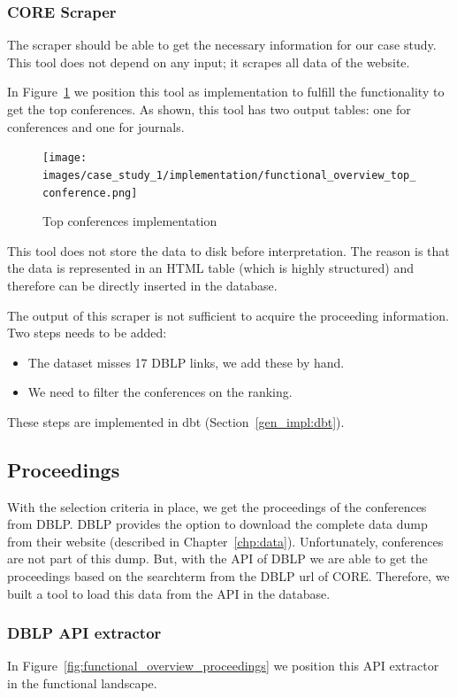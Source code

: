 \documentclass{ou-report}
\newcommand{\dblp}{DBLP}
\newcommand{\api}{API}
\begin{document}
\subsubsection{CORE Scraper}
The scraper should be able to get the necessary information for our case 
study.
This tool does not depend on any input; it scrapes all data of the website.

In Figure~\ref{fig:functional_overview_top_conferences} we position this tool as 
implementation to
fulfill the functionality to get the top conferences. As shown, this tool has two
output tables: one for conferences and one for journals.

\begin{figure}[H]
    \centering
    \texttt{[image: images/case\_study\_1/implementation/functional\_overview\_top\_conference.png]}
    \caption{Top conferences implementation}
    \label{fig:functional_overview_top_conferences}
\end{figure}

This tool does not store the data to disk before interpretation. The reason is 
that the data is represented in an HTML table (which is highly structured) and 
therefore can be directly inserted in the database.

The output of this scraper is not sufficient to acquire the proceeding information. 
Two steps needs to be added:
\begin{itemize}
    \item The dataset misses 17 \dblp{} links, we add these by hand.
    \item We need to filter the conferences on the ranking.
\end{itemize}
These steps are implemented in dbt (Section~\ref{gen_impl:dbt}).

\subsection{Proceedings}
With the selection criteria in place, we get the proceedings of the 
conferences from \dblp{}. \dblp{} provides the option to download the complete 
data dump from their website (described in Chapter~\ref{chp:data}). 
Unfortunately, conferences are not part of this dump. But, with the API of 
\dblp{} we are able to get the proceedings based on the searchterm from the 
\dblp{} url of CORE. Therefore, we built a tool to load this data from the 
\api{} in the database.
\subsubsection{DBLP API extractor}
In Figure~\ref{fig:functional_overview_proceedings} we position this \api{} 
extractor in the functional landscape.
\end{document}
